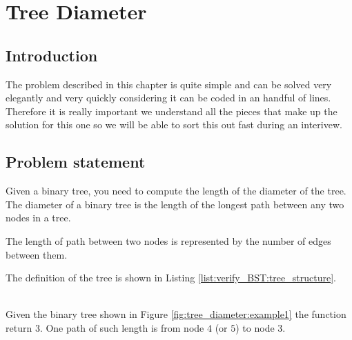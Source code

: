 %

\chapter{Tree Diameter}
\label{ch:tree_diameter}
\section*{Introduction}
The problem described in this chapter is quite simple and can be solved very elegantly and very quickly considering it can be coded in an handful of lines. Therefore it is really important we understand all the pieces that make up the solution for this one so we will be able to sort this out fast during an interivew.

\section{Problem statement}
\begin{exercise}
 Given a binary tree, you need to compute the length of the diameter of the tree. The diameter of a binary tree is the length of the longest path between any two nodes in a tree.

 The length of path between two nodes is represented by the number of edges between them.

 The definition of the tree is shown in Listing \ref{list:verify_BST:tree_structure}.


	\begin{example}
	\hfill \\
	Given the binary tree shown in Figure \ref{fig:tree_diameter:example1} the function return $3$. One path of such length is from node $4$ (or $5$) to node $3$.
	\end{example}

\end{exercise}

